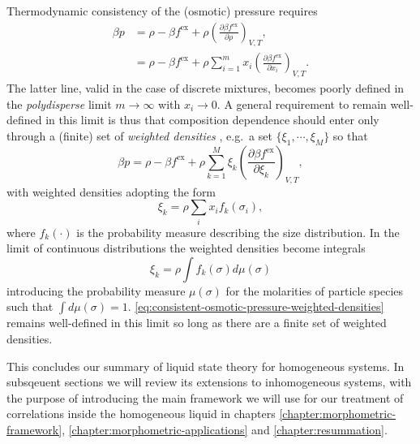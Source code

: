 Thermodynamic consistency of the (osmotic) pressure requires
\begin{subequations}
  \begin{align}
    \label{eq:consistent-osmotic-pressure}
    \beta p
    &=
    \rho - \beta f^\mathrm{ex}
    + \rho \left( \frac{\partial \beta f^\mathrm{ex}}{\partial \rho} \right)_{V,T},
    \\
    \label{eq:consistent-osmotic-pressure-mixtures}
    &=
    \rho - \beta f^\mathrm{ex}
    + \rho \sum_{i=1}^m
    x_i \left( \frac{\partial \beta f^\mathrm{ex}}{\partial x_i} \right)_{V,T}.
  \end{align}
\end{subequations}
The latter line, valid in the case of discrete mixtures, becomes poorly defined in the \emph{polydisperse} limit $m \to \infty$ with $x_i \to 0$.
A general requirement to remain well-defined in this limit is thus that composition dependence should enter only through a (finite) set of \emph{weighted densities} \cite{GualtieriJCP1982, WarrenPRL1998, SollichPRL1998, SollichAiCP2001}, e.g.\ a set $\{\xi_1, \cdots, \xi_M\}$ so that
\begin{equation}\label{eq:consistent-osmotic-pressure-weighted-densities}
  \beta p
  =
  \rho - \beta f^\mathrm{ex}
  + \rho \sum_{k=1}^M
  \xi_k \left( \frac{\partial \beta f^\mathrm{ex}}{\partial \xi_k} \right)_{V,T},
\end{equation}
with weighted densities adopting the form
\begin{equation*}
  \xi_k
  =
  \rho \sum_i x_i f_k(\sigma_i),
\end{equation*}
where $f_k(\cdot)$ is the probability measure describing the size distribution.
In the limit of continuous distributions the weighted densities become integrals
\begin{equation*}
  \xi_k
  =
  \rho \int f_k(\sigma) d\mu(\sigma)
\end{equation*}
introducing the probability measure $\mu(\sigma)$ for the molarities of particle species such that $\int d\mu(\sigma) = 1$.
\eqref{eq:consistent-osmotic-pressure-weighted-densities} remains well-defined in this limit so long as there are a finite set of weighted densities.

This concludes our summary of liquid state theory for homogeneous systems.
In subsqeuent sections we will review its extensions to inhomogeneous systems, with the purpose of introducing the main framework we will use for our treatment of correlations inside the homogeneous liquid in chapters \ref{chapter:morphometric-framework}, \ref{chapter:morphometric-applications} and \ref{chapter:resummation}.

